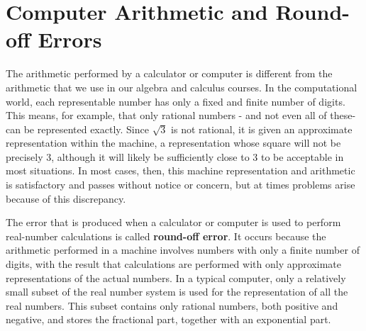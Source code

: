 %
%
%

\section{Computer Arithmetic and Round-off Errors}

\videolesson
\begin{selfvideo}[1]
\end{selfvideo}
The arithmetic performed by a calculator or computer is different from the arithmetic that we use in our algebra and calculus courses. In the computational world, each representable number has only a fixed and finite number of digits. This means, for example, that only rational numbers - and not even all of these-can be represented exactly. Since $\sqrt{3}$ is not rational, it is given an approximate representation within the machine, a representation whose square will not be precisely $3$, although it will likely be sufficiently close to 3 to be acceptable in most situations. In most cases, then, this machine representation and arithmetic is satisfactory and passes without notice or concern, but at times problems arise because of this discrepancy.

The error that is produced when a calculator or computer is used to perform real-number calculations is called {\bf round-off error}. It occurs because the arithmetic performed in a machine involves numbers with only a finite number of digits, with the result that calculations are performed with only approximate representations of the actual numbers. In a typical computer, only a relatively small subset of the real number system is used for the representation of all the real numbers. This subset contains only rational numbers, both positive and negative, and stores the fractional part, together with an exponential part.

